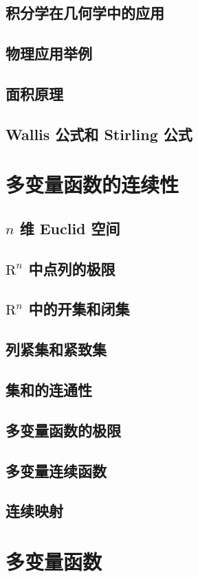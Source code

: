 \documentclass[a4paper, 12pt]{ctexbook}
\begin{document}
        \section{积分学在几何学中的应用}
        \section{物理应用举例}
        \section{面积原理}
        \section{Wallis 公式和 Stirling 公式}
    \chapter{多变量函数的连续性}
        \section{$n$ 维 Euclid 空间}
        \section{$\mathrm{R}^n$ 中点列的极限}
        \section{$\mathrm{R}^n$ 中的开集和闭集}
        \section{列紧集和紧致集}
        \section{集和的连通性}
        \section{多变量函数的极限}
        \section{多变量连续函数}
        \section{连续映射}
    \chapter{多变量函数}
\end{document}
